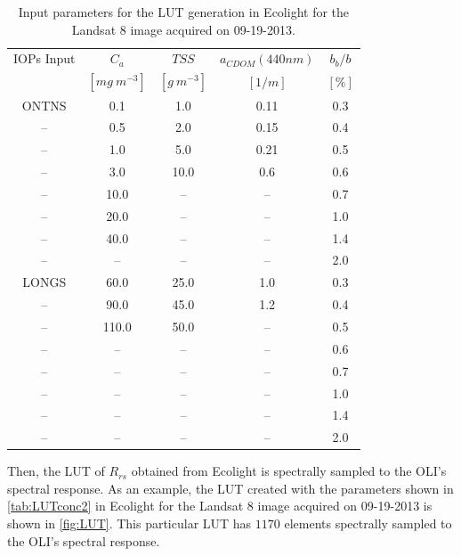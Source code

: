 \documentclass[onecolumn,3p,letterpaper]{elsarticle}
\begin{document}
\begin{table}[htb]
\caption{Input parameters for the LUT generation in Ecolight for the Landsat 8 image acquired on 09-19-2013. \label{tab:LUTconc2}} 
\small
\centering
		\begin{tabular}{c|c|c|c|c}
		\hline \hline
        		IOPs Input & \bfseries{$C_a$} & \bfseries{$TSS$} & \bfseries{$a_{CDOM}(440nm)$} & \bfseries{$b_b/b$}   	\\
				           & $[mg~m^{-3}]$			  & $[g~m^{-3}]$ 			 & 	$[1/m]$ 					& $[\%]$		  	  	\\ \hline \hline
ONTNS 	&  0.1  	& 1.0  		&  0.11		&  0.3 	\\
-- 		&  0.5  	& 2.0  		&  0.15		&  0.4 	\\
--    	&  1.0  	& 5.0  		&  0.21		&  0.5 	\\
--    	&  3.0  	& 10.0		&  0.6 		&  0.6 	\\ 
-- 		&  10.0     & -- 		&  --		&  0.7	\\	
--    	&  20.0     & -- 		&  --		&  1.0	\\	
--    	&  40.0     & -- 		&  --		&  1.4	\\
--    	&  --       & -- 		&  --		&  2.0	\\ \hline

LONGS 	&  60.0  	& 25.0		&  1.0 		&  0.3  \\
--    	&  90.0  	& 45.0		&  1.2 		&  0.4  \\
--    	&  110.0 	& 50.0		&  --  		&  0.5  \\
--    	&  --   	& --    	&  --  		&  0.6  \\  
--    	&  --   	& --   		&  --  		&  0.7 	\\  
--    	&  --   	& --   		&  --  		&  1.0 	\\   
--    	&  --   	& --   		&  --  		&  1.4 	\\  
--    	&  --   	& --   		&  --  		&  2.0 	\\  \hline \hline
	 	\end{tabular}
	\end{table}

Then, the LUT of $R_{rs}$ obtained from Ecolight is spectrally sampled to the OLI's spectral response. As an example, the LUT created with the parameters shown in \autoref{tab:LUTconc2} in Ecolight for the Landsat 8 image acquired on 09-19-2013 is shown in \autoref{fig:LUT}. This particular LUT has $1170$ elements spectrally sampled to the OLI's spectral response.
\end{document}
